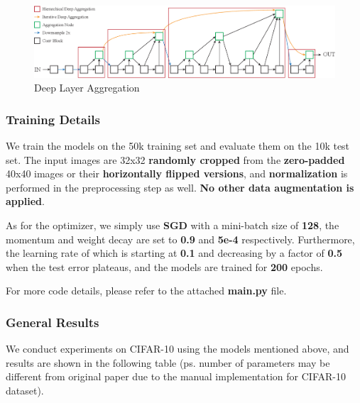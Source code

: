 \documentclass[a4paper, 11pt]{article} %
\begin{document}
\begin{figure}[H]
	\centering
	\includegraphics[width=1.0\textwidth]{./img/dla.png}
	\caption{Deep Layer Aggregation}
\end{figure}

\subsubsection{\textbf{Training Details}}

We train the models on the 50k training set and evaluate them on the 10k test set. The input
images are 32x32 \textbf{randomly cropped} from the \textbf{zero-padded} 40x40 images or
their \textbf{horizontally flipped versions}, and \textbf{normalization} is performed in the
preprocessing step as well. \textbf{No other data augmentation is applied}.

As for the optimizer, we simply use \textbf{SGD} with a mini-batch size of \textbf{128}, the
momentum and weight decay are set to \textbf{0.9} and \textbf{5e-4} respectively. Furthermore,
the learning rate of which is starting at \textbf{0.1} and decreasing by a factor of
\textbf{0.5} when the test error plateaus, and the models are trained for \textbf{200} epochs.

For more code details, please refer to the attached \textbf{main.py} file.

\subsubsection{\textbf{General Results}}

We conduct experiments on CIFAR-10 using the models mentioned above, and results are shown in
the following table (ps. number of parameters may be different from original paper due to the
manual implementation for CIFAR-10 dataset).
\end{document}
